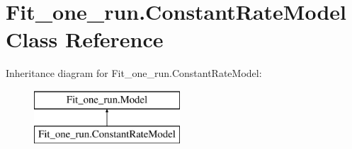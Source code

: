 \hypertarget{classFit__one__run_1_1ConstantRateModel}{\section{\-Fit\-\_\-one\-\_\-run.\-Constant\-Rate\-Model \-Class \-Reference}
\label{classFit__one__run_1_1ConstantRateModel}
}
\-Inheritance diagram for \-Fit\-\_\-one\-\_\-run.\-Constant\-Rate\-Model\-:\begin{figure}[H]
\begin{center}
\leavevmode
\includegraphics[height=2.000000cm]{classFit__one__run_1_1ConstantRateModel}
\end{center}
\end{figure}
